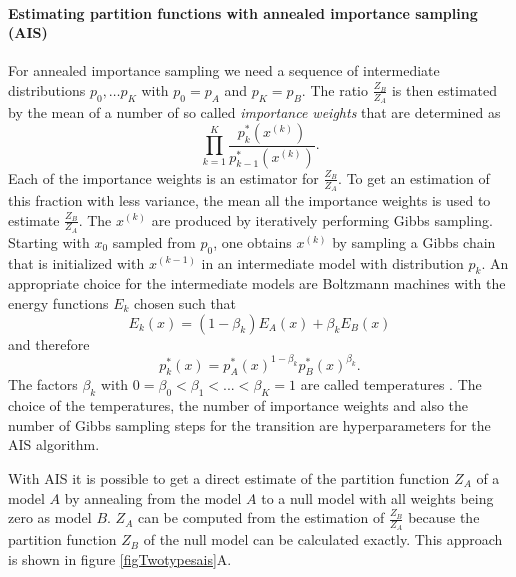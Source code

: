 \documentclass[12pt]{article}
\begin{document}
\paragraph{Estimating partition functions with annealed importance sampling (AIS)}\label{methodAIS}

For annealed importance sampling we need a sequence of intermediate distributions
$p_0, \dots p_K$ with
$p_0 = p_A$ and $p_K = p_B$. The ratio $\frac{Z_B}{Z_A}$ is then estimated by the mean of a number of so called {\em importance weights} that are determined as
\[
   \prod_{k=1}^K \frac{p^*_k(x^{(k)})}{p^*_{k-1}(x^{(k)})}.
\]
Each of the importance weights is an estimator for $\frac{Z_B}{Z_A}$.
To get an estimation of this fraction with less variance, the mean all the importance weights is used to estimate  $\frac{Z_B}{Z_A}$.
The $x^{(k)}$ are produced by iteratively performing Gibbs sampling. Starting with $x_0$ sampled from $p_0$, one obtains $x^{(k)}$ by sampling a Gibbs chain that is initialized with $x^{(k-1)}$ in an intermediate model with distribution $p_k$. An appropriate choice for the intermediate models are Boltzmann machines with the energy functions $E_k$ chosen such that
\[
   E_k(x) = (1 - \beta_k) E_A(x) + \beta_k E_B(x)
\]
and therefore
\[
   p_k^*(x) = p_A^*(x)^{1-\beta_k} p_B^*(x)^{\beta_k}.
\]
The factors $\beta_k$ with $0 = \beta_0 < \beta_1 < ... < \beta_K = 1$ are called temperatures \citep{salakhutdinov2008learning}.
The choice of the temperatures, the number of importance weights and also the number of Gibbs sampling steps for the transition are hyperparameters for the AIS algorithm.

With AIS it is possible to get a direct estimate of the partition function $Z_A$ of a model $A$ by annealing from the model $A$ to a null model with all weights being zero as model $B$.
$Z_A$ can be computed from the estimation of $\frac{Z_B}{Z_A}$ because the partition function $Z_B$ of the null model can be calculated exactly. This approach is shown in figure \ref{figTwotypesais}A.
\end{document}
